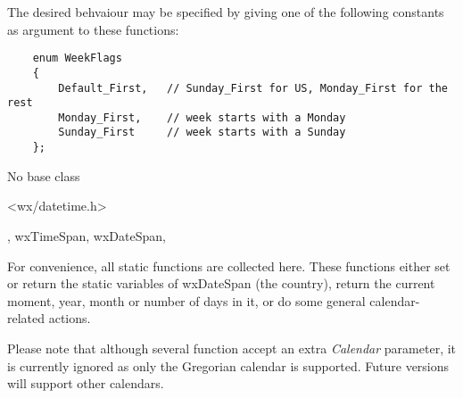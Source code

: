 The desired behvaiour may be specified by giving one of the following
constants as argument to these functions:

\begin{verbatim}
    enum WeekFlags
    {
        Default_First,   // Sunday_First for US, Monday_First for the rest
        Monday_First,    // week starts with a Monday
        Sunday_First     // week starts with a Sunday
    };
\end{verbatim}


No base class


<wx/datetime.h>


,\rtfsp
wxTimeSpan,\rtfsp
wxDateSpan,\rtfsp
{}



For convenience, all static functions are collected here. These functions
either set or return the static variables of wxDateSpan (the country), return
the current moment, year, month or number of days in it, or do some general
calendar-related actions.

Please note that although several function accept an extra {\it Calendar} 
parameter, it is currently ignored as only the Gregorian calendar is
supported. Future versions will support other calendars.

\\
\\
\\
\\
\\
\\
\\
\\
\\
\\
\\
\\
\\
\\
\\
\\
\\

